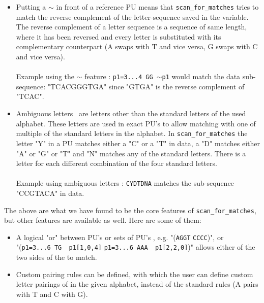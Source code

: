 \documentclass[12pt]{article}
\newcommand{\scm}{\texttt{scan\_for\_matches} }
\newcommand{\pu}{PU }
\newcommand{\pus}{PU's }
\begin{document}
\begin{itemize}
Example using single-letter edits : \texttt{p1=12...15\; ATTCC[1,0,3]\; p1[2,2,2]} 
where the exact \pu is allowed 1 mismatch, 0
deletions and 3 insertions and the reference \pu is allowed 2 of each.
\item Putting a $\sim$ in front of a reference \pu means that \scm tries to match the reverse 
complement of the letter-sequence saved in the variable. 
The reverse complement of a letter sequence is a sequence of same length, where it has been reversed and every letter
is substituted with its complementary counterpart (A swaps with T and vice versa, G swaps with C and vice versa).\\ \\
Example using the $\sim$ feature : \texttt{p1=3...4\; GG\; $\sim$p1} would match the data sub-sequence:
"TCACGGGTGA" since "GTGA" is the reverse complement of "TCAC".
\item Ambiguous letters~\cite{ambi} are letters other than the standard letters of the used alphabet. These letters are used
in exact \pus to allow matching with one of multiple of the standard letters in the alphabet.
In \scm the letter "Y" in a \pu matches either a "C" or a "T" in data, a "D" matches either "A" or "G" or "T" 
and "N" matches any of the standard letters. There is a letter for each different combination of the
four standard letters. \\ \\
Example using ambiguous letters : \texttt{CYDTDNA} matches the sub-sequence "CCGTACA" in data.
\end{itemize}
The above are what we have found to be the core features of \texttt{scan\_for\_matches}, 
but other features are available as well. Here are some of them: 
\begin{itemize}
\item A logical "or" between \pus or sets of \pus, e.g. "(\texttt{AGGT} \text{\textbar} \texttt{CCCC})", or  \\
"(\texttt{p1=3...6 TG ~p1[1,0,4]} \text{\textbar} \texttt{p1=3...6 AAA ~p1[2,2,0]})"
allows either of the two sides of the \text{\textbar} to match.
\item Custom pairing rules can be defined, with which the user can define custom letter pairings of in the given
alphabet, instead of the standard rules (A pairs with T and C with G).
\end{itemize}
\end{document}
